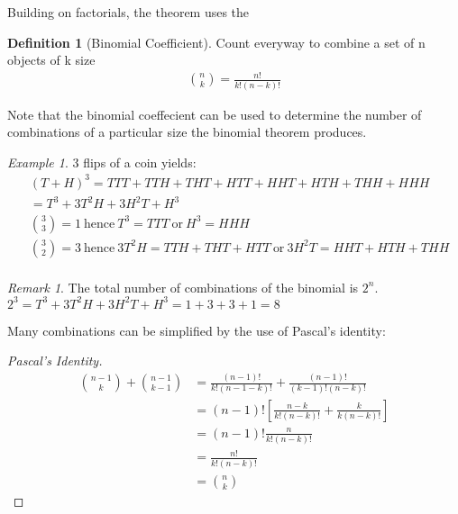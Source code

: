 \documentclass{article}
\theoremstyle{plain}
\theoremstyle{definition}
\newtheorem{definition}{Definition}
\theoremstyle{remark}
\newtheorem{remark}{Remark}
\newtheorem{example}{Example}
\begin{document}
Building on factorials, the theorem uses the
\begin{definition}[Binomial Coefficient]
  Count everyway to combine a set of n objects of k size
  \begin{align*}
    \binom{n}{k} = \frac{n!}{k!(n-k)!}
  \end{align*}
\end{definition}
Note that the binomial coeffecient can be used to determine the number of combinations of a particular size the binomial theorem produces.
\begin{example}
  3 flips of a coin yields:
  \begin{align*}
  &(T + H)^3 = TTT + TTH + THT + HTT + HHT+ HTH + THH + HHH \\
  &= T^3 + 3T^2H + 3H^2T + H^3 \\
  &\binom{3}{3} = 1\ \text{hence}\ T^3 = TTT\ \text{or}\ H^3 = HHH \\
  &\binom{3}{2} = 3\ \text{hence}\ 3T^2H = TTH + THT + HTT\ \text{or}\ 3H^2T = HHT+HTH+THH \\
  \end{align*}
\end{example}
\begin{remark}
  The total number of combinations of the binomial is $2^n$. \\
  $2^3 = T^3 + 3T^2H + 3H^2T + H^3 = 1 + 3 + 3 + 1 = 8$
\end{remark}
Many combinations can be simplified by the use of Pascal's identity:
\begin{proof}[Pascal's Identity]
  \begin{align*}
    \binom{n - 1}{k} + \binom{n - 1}{k - 1} &= \frac{(n-1)!}{k!(n - 1 - k)!} + \frac{(n - 1)!}{(k-1)!(n-k)!} \\
    &= (n - 1)![\frac{n-k}{k!(n-k)!} + \frac{k}{k(n-k)!}] \\
    &= (n - 1)!\frac{n}{k!(n-k)!} \\
    &= \frac{n!}{k!(n - k)!} \\
    &= \binom{n}{k}
  \end{align*}
\end{proof}
\end{document}
